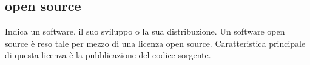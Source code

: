 \section{}
\subsection*{open source} Indica un software, il suo sviluppo o la sua distribuzione. Un software open source è reso tale per mezzo di una licenza open source. Caratteristica principale di questa licenza è la pubblicazione del codice sorgente.